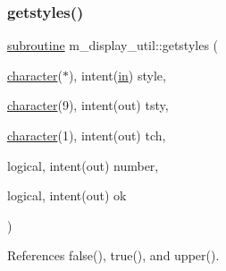 \subsubsection{\texorpdfstring{getstyles()}{getstyles()}}
{\footnotesize\ttfamily \hyperlink{M__stopwatch_83_8txt_acfbcff50169d691ff02d4a123ed70482}{subroutine} m\+\_\+display\+\_\+util\+::getstyles (\begin{DoxyParamCaption}\item[{\hyperlink{option__stopwatch_83_8txt_abd4b21fbbd175834027b5224bfe97e66}{character}($\ast$), intent(\hyperlink{M__journal_83_8txt_afce72651d1eed785a2132bee863b2f38}{in})}]{style,  }\item[{\hyperlink{option__stopwatch_83_8txt_abd4b21fbbd175834027b5224bfe97e66}{character}(9), intent(out)}]{tsty,  }\item[{\hyperlink{option__stopwatch_83_8txt_abd4b21fbbd175834027b5224bfe97e66}{character}(1), intent(out)}]{tch,  }\item[{logical, intent(out)}]{number,  }\item[{logical, intent(out)}]{ok }\end{DoxyParamCaption})\hspace{0.3cm}{\ttfamily [private]}}



References false(), true(), and upper().


